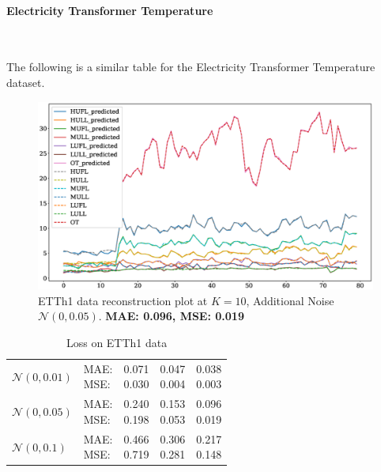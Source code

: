 \documentclass{article}
\begin{document}
{\paragraph{Electricity Transformer Temperature}\

The following is a similar table for the Electricity Transformer Temperature dataset.

\begin{figure}[H]
	\centering
	\includegraphics[width=\textwidth]{ETT_time_series_K10N005.eps}
	\caption{ETTh1 data reconstruction plot at $K=10$, Additional Noise $\mathcal{N}(0, 0.05)$. \textbf{MAE: 0.096, MSE: 0.019}}
	\label{fig:fig7}
\end{figure}

\begin{table}[!h]
\def\arraystretch{2.3}
\begin{center}
\caption{Loss on ETTh1 data}
\begin{tabular}{|l||l||*{3}{c|}}\hline
	\backslashbox{Noise}{Parameters}
	&\makebox[3em]{Metric}&\makebox[3em]{$K=2$}&\makebox[3em]{$K=4$}&\makebox[3em]{$K=10$}\\\hline
	$\mathcal{N}(0, 0.01)$&\makecell{ MAE: \\ MSE: } &\makecell{ 0.071 \\ 0.030 }&\makecell{ 0.047 \\ 0.004 }&\makecell{ 0.038 \\ 0.003 }\\\hline
	$\mathcal{N}(0, 0.05)$&\makecell{ MAE: \\ MSE: } &\makecell{ 0.240 \\ 0.198 }&\makecell{ 0.153 \\ 0.053 }&\makecell{ 0.096 \\ 0.019 }\\\hline
	$\mathcal{N}(0, 0.1)$& \makecell{ MAE: \\ MSE: } &\makecell{ 0.466 \\ 0.719 }&\makecell{ 0.306 \\ 0.281 }&\makecell{ 0.217 \\ 0.148 }\\\hline
\end{tabular}
\end{center}
\end{table}


}
\end{document}
